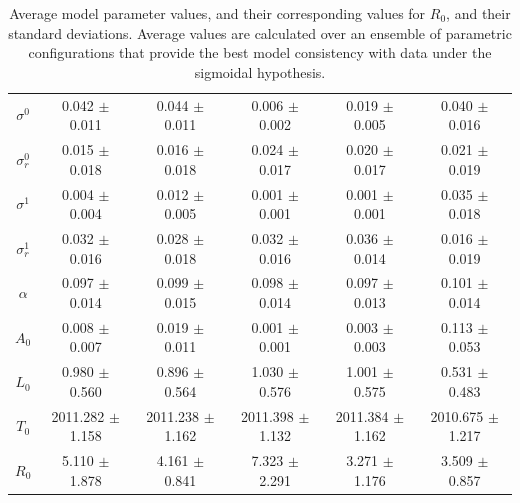 \documentclass[preprint,12pt]{elsarticle}
\begin{document}
\begin{table}
\begin{tabular}{cccccc}
\hline
{\bf $\sigma^0$} & 0.042 $\pm$ 0.011 & 0.044 $\pm$ 0.011 & 0.006 $\pm$ 0.002 & 0.019 $\pm$ 0.005 & 0.040 $\pm$ 0.016 \\
{\bf $\sigma^0_r$} & 0.015 $\pm$ 0.018 & 0.016 $\pm$ 0.018 & 0.024 $\pm$ 0.017 & 0.020 $\pm$ 0.017 & 0.021 $\pm$ 0.019 \\
{\bf $\sigma^1$} & 0.004 $\pm$ 0.004 & 0.012 $\pm$ 0.005 & 0.001 $\pm$ 0.001 & 0.001 $\pm$ 0.001 & 0.035 $\pm$ 0.018 \\
{\bf $\sigma^1_r$} & 0.032 $\pm$ 0.016 & 0.028 $\pm$ 0.018 & 0.032 $\pm$ 0.016 & 0.036 $\pm$ 0.014 & 0.016 $\pm$ 0.019 \\
{\bf $\alpha$} & 0.097 $\pm$ 0.014 & 0.099 $\pm$ 0.015 & 0.098 $\pm$ 0.014 & 0.097 $\pm$ 0.013 & 0.101 $\pm$ 0.014 \\
{\bf $A_0$} & 0.008 $\pm$ 0.007 & 0.019 $\pm$ 0.011 & 0.001 $\pm$ 0.001 & 0.003 $\pm$ 0.003 & 0.113 $\pm$ 0.053 \\
{\bf $L_0$} & 0.980 $\pm$ 0.560 & 0.896 $\pm$ 0.564 & 1.030 $\pm$ 0.576 & 1.001 $\pm$ 0.575 & 0.531 $\pm$ 0.483 \\
{\bf $T_0$} & 2011.282 $\pm$ 1.158 & 2011.238 $\pm$ 1.162 & 2011.398 $\pm$ 1.132 & 2011.384 $\pm$ 1.162 & 2010.675 $\pm$ 1.217 \\
\hline
\rowcolor{blue!15}
{\bf $R_0$} & 5.110 $\pm$ 1.878& 4.161 $\pm$ 0.841& 7.323 $\pm$ 2.291& 3.271 $\pm$ 1.176& 3.509 $\pm$ 0.857\\
\hline\hline
\end{tabular}
\caption{Average model parameter values, and their corresponding values for $R_0$, and their standard deviations. Average values are calculated over an ensemble of parametric configurations that provide the best model consistency with data under the sigmoidal hypothesis.}
\label{T2:Parameter_Values}
\end{table}
\end{document}
